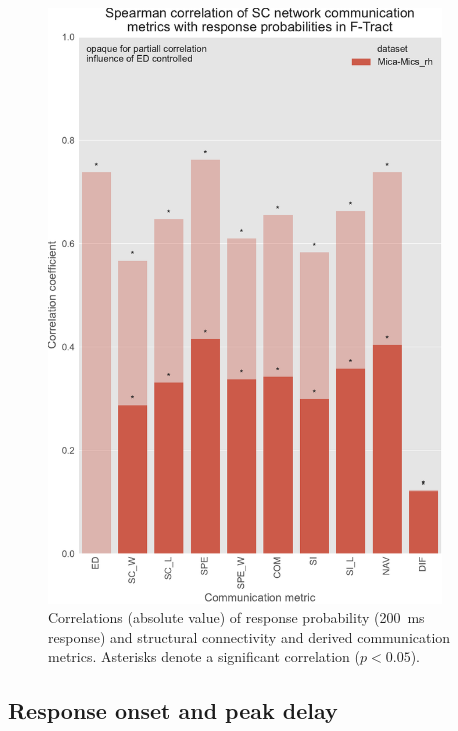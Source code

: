 \begin{figure}
    \centering
    \includegraphics[width=0.93\textwidth]{images/nootebook_generated/ftract_results/MNI-HCP-MMP1/5/ED0/0.25/long/mica_rhSpearman_correlation_of_SC_network_communication_metrics_with_response_probabilities_in_F-Tract.pdf}
    \caption[F-Tract probability correlations - Mica-Mics\_rh 200 ms]{Correlations (absolute value) of response probability (200~ms response) and structural connectivity and derived communication metrics. Asterisks denote a significant correlation ($p<0.05$).}
    \label{fig:ftract_mica_long_probabilities}
\end{figure}

\subsection{Response onset and peak delay}

